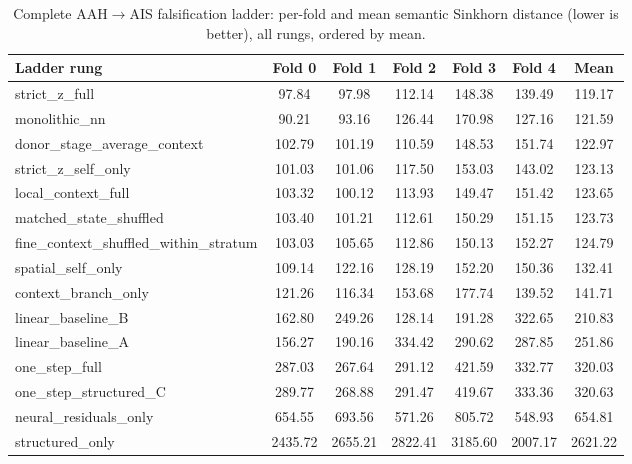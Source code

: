\begin{table}[htbp]
  \centering
  \caption[Complete AAH$\rightarrow$AIS falsification ladder]{Complete AAH$\rightarrow$AIS
  falsification ladder: per-fold and mean semantic Sinkhorn distance (lower is better), all rungs,
  ordered by mean.}
  \label{tab:app-c-ladder-aah}
  \footnotesize
  \begin{tabular}{lcccccc}
    \toprule
    Ladder rung & Fold 0 & Fold 1 & Fold 2 & Fold 3 & Fold 4 & Mean \\
    \midrule
    strict\_z\_full & 97.84 & 97.98 & 112.14 & 148.38 & 139.49 & 119.17 \\
    monolithic\_nn & 90.21 & 93.16 & 126.44 & 170.98 & 127.16 & 121.59 \\
    donor\_stage\_average\_context & 102.79 & 101.19 & 110.59 & 148.53 & 151.74 & 122.97 \\
    strict\_z\_self\_only & 101.03 & 101.06 & 117.50 & 153.03 & 143.02 & 123.13 \\
    local\_context\_full & 103.32 & 100.12 & 113.93 & 149.47 & 151.42 & 123.65 \\
    matched\_state\_shuffled & 103.40 & 101.21 & 112.61 & 150.29 & 151.15 & 123.73 \\
    fine\_context\_shuffled\_within\_stratum & 103.03 & 105.65 & 112.86 & 150.13 & 152.27 & 124.79 \\
    spatial\_self\_only & 109.14 & 122.16 & 128.19 & 152.20 & 150.36 & 132.41 \\
    context\_branch\_only & 121.26 & 116.34 & 153.68 & 177.74 & 139.52 & 141.71 \\
    linear\_baseline\_B & 162.80 & 249.26 & 128.14 & 191.28 & 322.65 & 210.83 \\
    linear\_baseline\_A & 156.27 & 190.16 & 334.42 & 290.62 & 287.85 & 251.86 \\
    one\_step\_full & 287.03 & 267.64 & 291.12 & 421.59 & 332.77 & 320.03 \\
    one\_step\_structured\_C & 289.77 & 268.88 & 291.47 & 419.67 & 333.36 & 320.63 \\
    neural\_residuals\_only & 654.55 & 693.56 & 571.26 & 805.72 & 548.93 & 654.81 \\
    structured\_only & 2435.72 & 2655.21 & 2822.41 & 3185.60 & 2007.17 & 2621.22 \\
    \bottomrule
  \end{tabular}
\end{table}

